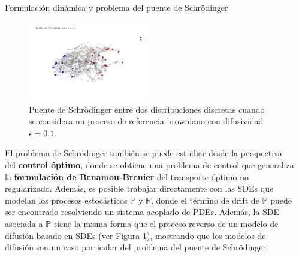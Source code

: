 \documentclass[final]{beamer}
\newlength{\sepwidth}
\newlength{\colwidth}
\newcommand{\separatorcolumn}{\begin{column}{\sepwidth}\end{column}}
\begin{document}
\begin{frame}[t]
\begin{columns}[t]
\begin{column}{\colwidth}
\begin{block}{Formulación dinámica y problema del puente de Schrödinger}
        \begin{figure}
          \centering
          \includegraphics[width=0.49\textwidth]{images/sbp_solution0.1}
          \caption{Puente de Schrödinger entre dos distribuciones discretas cuando se considera un proceso de referencia browniano con difusividad $\epsilon=0.1$.}
        \end{figure}

      El problema de Schrödinger también se puede estudiar desde la perspectiva del \textbf{control óptimo}, donde se obtiene una problema de control que generaliza la \textbf{formulación de Benamou-Brenier} del transporte óptimo no regularizado. Además, es posible trabajar directamente con las SDEs que modelan los procesos estocásticos $\mathbb{P}$ y $\mathbb{R}$, donde el término de drift de $\mathbb{P}$ puede ser encontrado resolviendo un sistema acoplado de PDEs. Además, la SDE asociada a $\mathbb{P}$ tiene la misma forma que el proceso reverso de un modelo de difusión basado en SDEs (ver Figura 1), mostrando que los modelos de difusión son un caso particular del problema del puente de Schrödinger.

      \end{block}

    \end{column}
    \separatorcolumn



  \end{columns}
\end{frame}
\end{document}
